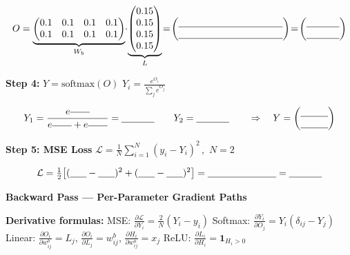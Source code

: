 \documentclass[11pt]{article}
\newcommand{\blk}[1]{\underline{\hspace{#1}}}
\begin{document}
\[
O = \underbrace{\begin{pmatrix} 0.1 & 0.1 & 0.1 & 0.1 \\
      0.1 & 0.1 & 0.1 & 0.1 \end{pmatrix}}_{W_b}
\!\cdot\!
\underbrace{\begin{pmatrix} 0.15 \\ 0.15 \\ 0.15 \\ 0.15 \end{pmatrix}}_{L}
\!=\! \begin{pmatrix} \blk{3.8cm} \\ \blk{3.8cm} \end{pmatrix} \!=\! \begin{pmatrix} \blk{1.2cm} \\ \blk{1.2cm} \end{pmatrix}
\]


\textbf{Step 4:} $Y = \text{softmax}(O)$ \quad
{\small $\displaystyle Y_i = \frac{e^{O_i}}{\sum_j e^{O_j}}$}

\[
Y_1 = \frac{e^{\blk{0.7cm}}}{e^{\blk{0.7cm}}+e^{\blk{0.7cm}}} = \blk{1.2cm}
\qquad
Y_2 = \blk{1.2cm}
\qquad\Rightarrow\quad
Y = \begin{pmatrix} \blk{1cm} \\ \blk{1cm} \end{pmatrix}
\]


\textbf{Step 5: MSE Loss}\quad
$\displaystyle\mathcal{L}=\tfrac{1}{N}\!\sum_{i=1}^{N}(y_i - Y_i)^2$\,,\ $N\!=\!2$

\[
\mathcal{L} = \tfrac{1}{2}\!\left[(\blk{0.6cm} - \blk{0.6cm})^2
+ (\blk{0.6cm} - \blk{0.6cm})^2\right]
= \blk{2.5cm} = \blk{1.2cm}
\]


\newpage
{\large \textbf{Backward Pass --- Per-Parameter Gradient Paths}}
\vspace{2pt}



\vspace{-6pt}
{\small\textbf{Derivative formulas:}\;
MSE: $\frac{\partial\mathcal{L}}{\partial Y_i}\!=\!\frac{2}{N}(Y_i\!-\!y_i)$\;\;
Softmax: $\frac{\partial Y_i}{\partial O_j}\!=\!Y_i(\delta_{ij}\!-\!Y_j)$\;\;
Linear: $\frac{\partial O_i}{\partial w^b_{ij}}\!=\!L_j$,\;
$\frac{\partial O_i}{\partial L_j}\!=\!w^b_{ij}$,\;
$\frac{\partial H_i}{\partial w^a_{ij}}\!=\!x_j$\;\;
ReLU: $\frac{\partial L_i}{\partial H_i}\!=\!\mathbf{1}_{H_i>0}$}
\end{document}
